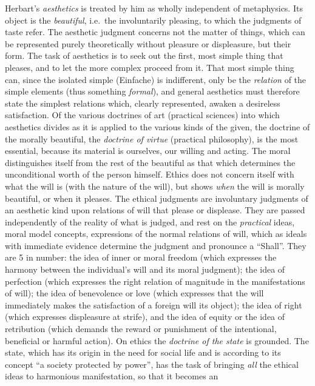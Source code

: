 Herbart's \emph{aesthetics} is treated by him as wholly independent of
metaphysics. Its object is the \emph{beautiful}, i.e.\ the
involuntarily pleasing, to which the judgments of taste refer. The
aesthetic judgment concerns not the matter of things, which can be
represented purely theoretically without pleasure or displeasure, but
their form. The task of aesthetics is to seek out the first, most
simple thing that pleases, and to let the more complex proceed from it.
That most simple thing can, since the isolated simple (Einfache) is
indifferent, only be the \emph{relation} of the simple elements (thus
something \emph{formal}), and general aesthetics must therefore state
the simplest relations which, clearly represented, awaken a desireless
satisfaction. Of the various doctrines of art (practical sciences)
into which aesthetics divides as it is applied to the various kinds of
the given, the doctrine of the morally beautiful, the \emph{doctrine of
virtue} (practical philosophy), is the most essential, because its
material is ourselves, our willing and acting. The moral distinguishes
itself from the rest of the beautiful as that which determines the
unconditional worth of the person himself. Ethics does not concern
itself with what the will is (with the nature of the will), but shows
\emph{when} the will is morally beautiful, or when it pleases. The
ethical judgments are involuntary judgments of an aesthetic kind upon
relations of will that please or displease. They are passed
independently of the reality of what is judged, and rest on the
\emph{practical} ideas, moral model concepts, expressions of the normal
relations of will, which as ideals with immediate evidence determine
the judgment and pronounce a ``Shall''. They are 5 in number: the idea
of inner or moral freedom (which expresses the harmony between the
individual's will and its moral judgment); the idea of perfection
(which expresses the right relation of magnitude in the manifestations
of will); the idea of benevolence or love (which expresses that the
will immediately makes the satisfaction of a foreign will its object);
the idea of right (which expresses displeasure at strife), and the idea
of equity or the idea of retribution (which demands the reward or
punishment of the intentional, beneficial or harmful action). On ethics
the \emph{doctrine of the state} is grounded. The state, which has its
origin in the need for social life and is according to its concept ``a
society protected by power'', has the task of bringing \emph{all} the
ethical ideas to harmonious manifestation, so that it becomes an
